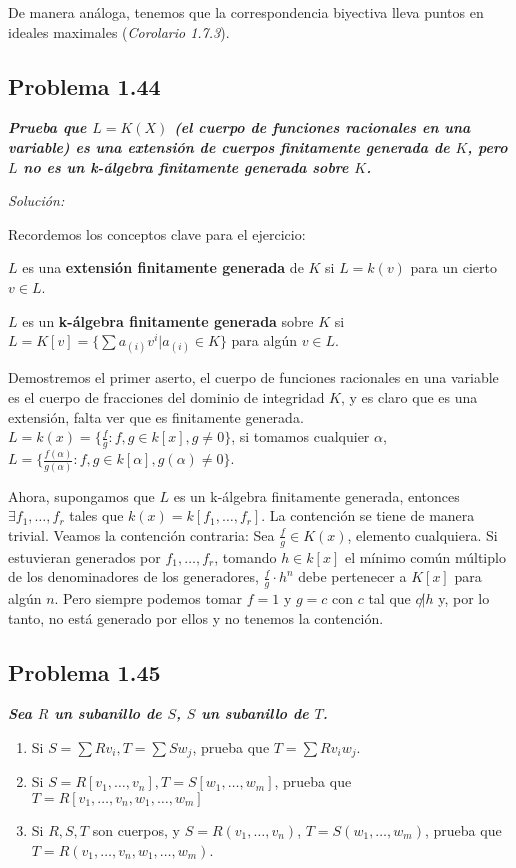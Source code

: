 De manera análoga, tenemos que la correspondencia biyectiva lleva puntos en ideales maximales (\textit{Corolario 1.7.3}).

\subsection{Problema 1.44}

\textit{\textbf{Prueba que $L=K(X)$ (el cuerpo de funciones racionales en una variable) es una extensión de cuerpos finitamente generada de $K$, pero $L$ no es un k-álgebra finitamente generada sobre $K$.}}

\textit{Solución: }

Recordemos los conceptos clave para el ejercicio:
\vspace{2mm}


$L$ es una \textbf{extensión finitamente generada} de $K$ si $L=k(v)$ para un cierto $v\in L$.

$L$ es un \textbf{k-álgebra finitamente generada} sobre $K$ si $L=K[v]= \{\sum a_{(i)}v^{i} | a_{(i)}\in K\}$ para algún $v\in L$.
\vspace{2mm}


Demostremos el primer aserto, el cuerpo de funciones racionales en una variable es el cuerpo de fracciones del dominio de integridad $K$, y es claro que es una extensión, falta ver que es finitamente generada. $L=k(x)=\{ \frac{f}{g}:f,g\in k[x],g\neq 0 \}$, si tomamos cualquier $\alpha $, $L= \{ \frac{f(\alpha)}{g(\alpha)}:f,g\in k[\alpha],g(\alpha) \neq 0 \}$.

Ahora, supongamos que $L$ es un k-álgebra finitamente generada, entonces $\exists f_1,\dots,f_r$ tales que $k(x)=k[f_1,\dots,f_r]$. La contención \framebox{$\supseteq $} se tiene de manera trivial. Veamos la contención contraria: Sea $\frac{f}{g}\in K(x)$, elemento cualquiera. Si estuvieran generados por $f_1,\dots,f_r$, tomando $h\in k[x]$ el mínimo común múltiplo de los denominadores de los generadores, $\frac{f}{g}\cdot h^n$ debe pertenecer a $K[x]$ para algún $n$. Pero siempre podemos tomar $f=1$ y $g=c$ con $c$ tal que $c\not | h$ y, por lo tanto, no está generado por ellos y no tenemos la contención.  

\subsection{Problema 1.45}

\textit{\textbf{Sea $R$ un subanillo de $S$, $S$ un subanillo de $T$.}}
\begin{enumerate}
    \item Si $S=\sum R v_i, T=\sum S w_j$, prueba que $T=\sum Rv_iw_j$.
    \item Si $S=R[v_1,\dots,v_n], T=S[w_1,\dots,w_m]$, prueba que $T=R[v_1,\dots,v_n,w_1,\dots,w_m]$
    \item Si $R,S,T$ son cuerpos, y $S=R(v_1,\dots,v_n)$, $T=S(w_1,\dots,w_m)$, prueba que $T=R(v_1,\dots,v_n,w_1,\dots,w_m)$.
\end{enumerate}

